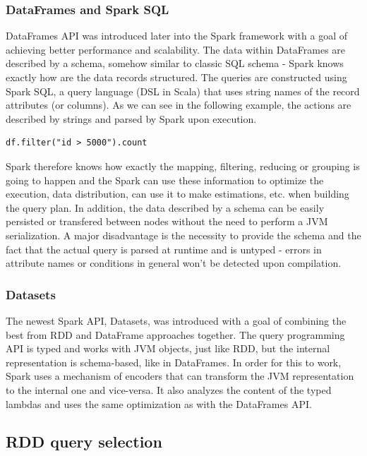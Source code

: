 \subsubsection{DataFrames and Spark SQL}

DataFrames API was introduced later into the Spark framework with a goal of achieving better performance and scalability. The data within DataFrames are described by a schema, somehow similar to classic SQL schema - Spark knows exactly how are the data records structured. The queries are constructed using Spark SQL, a query language (DSL in Scala) that uses string names of the record attributes (or columns). As we can see in the following example, the actions are described by strings and parsed by Spark upon execution.

\lstset{style=Scala}
\begin{lstlisting}
df.filter("id > 5000").count
\end{lstlisting}

Spark therefore knows how exactly the mapping, filtering, reducing or grouping is going to happen and the Spark can use these information to optimize the execution, data distribution, can use it to make estimations, etc. when building the query plan. In addition, the data described by a schema can be easily persisted or transfered between nodes without the need to perform a JVM serialization. A major disadvantage is the necessity to provide the schema and the fact that the actual query is parsed at runtime and is untyped - errors in attribute names or conditions in general won't be detected upon compilation.

\subsubsection{Datasets}

The newest Spark API, Datasets, was introduced with a goal of combining the best from RDD and DataFrame approaches together. The query programming API is typed and works with JVM objects, just like RDD, but the internal representation is schema-based, like in DataFrames. In order for this to work, Spark uses a mechanism of encoders that can transform the JVM representation to the internal one and vice-versa. It also analyzes the content of the typed lambdas and uses the same optimization as with the DataFrames API.

\subsection{RDD query selection}
